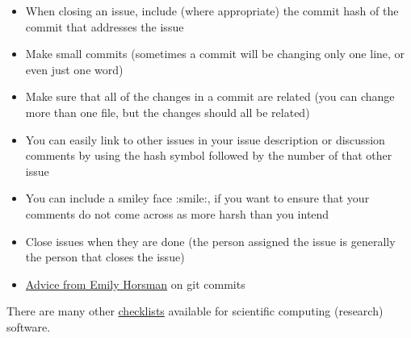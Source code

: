 \documentclass[12pt]{article}
\begin{document}
\begin{itemize}
\item When closing an issue, include (where appropriate) the commit hash of the
  commit that addresses the issue
\item Make small commits (sometimes a commit will be changing only one line, or
  even just one word)
\item Make sure that all of the changes in a commit are related (you can change
  more than one file, but the changes should all be related)
\item You can easily link to other issues in your issue description or
  discussion comments by using the hash symbol followed by the number
  of that other issue
\item You can include a smiley face :smile:, if you want to ensure that your
  comments do not come across as more harsh than you intend
\item Close issues when they are done (the person assigned the issue is
  generally the person that closes the issue)
\item 
  \href{https://gitlab.cas.mcmaster.ca/smiths/se2aa4_cs2me3/-/blob/master/FAQ/GitAdvice.txt}
  {Advice from Emily Horsman} on git commits
\end{itemize}

There are many other \href{https://gitlab.cas.mcmaster.ca/SEforSC/se4sc/-/wikis/Advice-and-Checklists-for-Repos-(source-of-recommended-artifacts)}{checklists} available for scientific computing (research) software.
\end{document}

